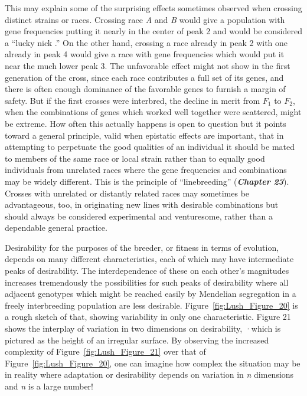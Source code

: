 This may explain some of the surprising effects sometimes observed
when crossing distinct strains or races. Crossing race \textit{A} and \textit{B} would
give a population with gene frequencies putting it nearly in the center
of peak 2 and would be considered a ``lucky nick .'' On the other hand,
crossing a race already in peak 2 with one already in peak 4 would give
a race with gene frequencies which would put it near the much lower
peak 3. The unfavorable effect might not show in the first generation of
the cross, since each race contributes a full set of its genes, and there is
often enough dominance of the favorable genes to furnish a margin of
safety. But if the first crosses were interbred, the decline in merit from
$F_1$ to $F_2$, when the combinations of genes which worked well together
were scattered, might be extreme. How often this actually happens is
open to question but it points toward a general principle, valid when
epistatic effects are important, that in attempting to perpetuate the
good qualities of an individual it should be mated to members of the
same race or local strain rather than to equally good individuals from
unrelated races where the gene frequencies and combinations may be
widely different. This is the principle of ``linebreeding'' (\textit{\textbf{Chapter 23}}).
Crosses with unrelated or distantly related races may sometimes be
advantageous, too, in originating new lines with desirable combinations
but should always be considered experimental and venturesome, rather
than a dependable general practice.

Desirability for the purposes of the breeder, or fitness in terms of
evolution, depends on many different characteristics, each of which
may have intermediate peaks of desirability. The interdependence of
these on each other's magnitudes increases tremendously the possibilities
for such peaks of desirability where all adjacent genotypes which
might be reached easily by Mendelian segregation in a freely interbreeding
population are less desirable. Figure~\ref{fig:Lush_Figure_20} is a rough sketch of
that, showing variability in only one characteristic. Figure 21 shows the
interplay of variation in two dimensions on desirability, ·which is pictured
as the height of an irregular surface. By observing the increased
complexity of Figure~\ref{fig:Lush_Figure_21} over that of Figure~\ref{fig:Lush_Figure_20}, one can imagine how
complex the situation may be in reality where adaptation or desirability
depends on variation in \textit{n} dimensions and \textit{n} is a large number!

